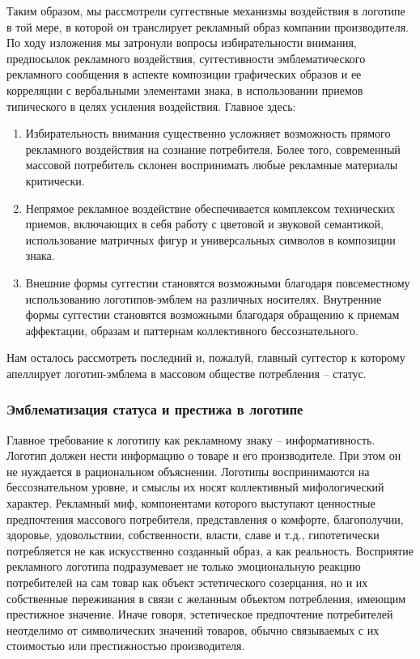 Таким образом, мы рассмотрели суггествные механизмы воздействия в логотипе в
той мере, в которой он транслирует рекламный образ компании производителя. По
ходу изложения мы затронули вопросы избирательности внимания, предпосылок рекламного
воздействия, суггестивности эмблематического рекламного сообщения в аспекте
композиции графических образов и ее корреляции с вербальными элементами знака,
в использовании приемов типического в целях усиления воздействия. Главное здесь:
\begin{enumerate}
\item Избирательность внимания существенно усложняет возможность прямого
  рекламного воздействия на сознание потребителя. Более того, современный
  массовой потребитель склонен воспринимать любые рекламные материалы
  критически.
\item Непрямое рекламное воздействие обеспечивается комплексом технических
  приемов, включающих в себя работу с цветовой и звуковой семантикой,
  использование матричных фигур и универсальных символов в композиции
  знака.
\item Внешние формы суггестии становятся возможными благодаря повсеместному
  использованию логотипов-эмблем на различных носителях. Внутренние формы
  суггестии становятся возможными благодаря обращению к приемам аффектации,
  образам и паттернам коллективного бессознательного.
\end{enumerate}

Нам осталось рассмотреть последний и, пожалуй, главный суггестор к которому
апеллирует логотип-эмблема в массовом обществе потребления -- статус.

\subsubsection{Эмблематизация статуса и престижа в логотипе}
Главное требование к логотипу как рекламному знаку -- информативность. Логотип
должен нести информацию о товаре и его производителе. При этом он не нуждается
в рациональном объяснении. Логотипы воспринимаются на бессознательном уровне,
и смыслы их носят коллективный мифологический характер. Рекламный миф,
компонентами которого выступают ценностные предпочтения массового потребителя,
представления о комфорте, благополучии, здоровье, удовольствии, собственности,
власти, славе и т.д., гипотетически потребляется не как искусственно созданный
образ, а как реальность. Восприятие рекламного логотипа подразумевает не только
эмоциональную реакцию потребителей на сам товар как объект эстетического
созерцания, но и их собственные переживания в связи с желанным объектом
потребления, имеющим престижное значение. Иначе говоря, эстетическое
предпочтение потребителей неотделимо от символических значений товаров, обычно
связываемых с их стоимостью или престижностью производителя.

